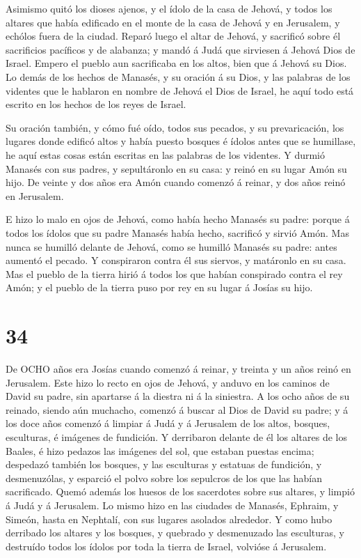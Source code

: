  Asimismo quitó los dioses ajenos, y el ídolo de la casa de
Jehová, y todos los altares que había edificado en el monte de la casa
de Jehová y en Jerusalem, y echólos fuera de la ciudad. 
Reparó luego el altar de Jehová, y sacrificó sobre él sacrificios
pacíficos y de alabanza; y mandó á Judá que sirviesen á Jehová Dios de
Israel.  Empero el pueblo aun sacrificaba en los altos,
bien que á Jehová su Dios.  Lo demás de los hechos de
Manasés, y su oración á su Dios, y las palabras de los videntes que le
hablaron en nombre de Jehová el Dios de Israel, he aquí todo está
escrito en los hechos de los reyes de Israel.

 Su oración también, y cómo fué oído, todos sus pecados, y
su prevaricación, los lugares donde edificó altos y había puesto bosques
é ídolos antes que se humillase, he aquí estas cosas están escritas en
las palabras de los videntes.  Y durmió Manasés con sus
padres, y sepultáronlo en su casa: y reinó en su lugar Amón su hijo.
 De veinte y dos años era Amón cuando comenzó á reinar, y
dos años reinó en Jerusalem.

 E hizo lo malo en ojos de Jehová, como había hecho Manasés
su padre: porque á todos los ídolos que su padre Manasés había hecho,
sacrificó y sirvió Amón.  Mas nunca se humilló delante de
Jehová, como se humilló Manasés su padre: antes aumentó el pecado.
 Y conspiraron contra él sus siervos, y matáronlo en su
casa.  Mas el pueblo de la tierra hirió á todos los que
habían conspirado contra el rey Amón; y el pueblo de la tierra puso por
rey en su lugar á Josías su hijo. 

\hypertarget{section-33}{%
\section{34}\label{section-33}}

 De OCHO años era Josías cuando comenzó á reinar, y treinta
y un años reinó en Jerusalem.  Este hizo lo recto en ojos de
Jehová, y anduvo en los caminos de David su padre, sin apartarse á la
diestra ni á la siniestra.  A los ocho años de su reinado,
siendo aún muchacho, comenzó á buscar al Dios de David su padre; y á los
doce años comenzó á limpiar á Judá y á Jerusalem de los altos, bosques,
esculturas, é imágenes de fundición.  Y derribaron delante
de él los altares de los Baales, é hizo pedazos las imágenes del sol,
que estaban puestas encima; despedazó también los bosques, y las
esculturas y estatuas de fundición, y desmenuzólas, y esparció el polvo
sobre los sepulcros de los que las habían sacrificado. 
Quemó además los huesos de los sacerdotes sobre sus altares, y limpió á
Judá y á Jerusalem.  Lo mismo hizo en las ciudades de
Manasés, Ephraim, y Simeón, hasta en Nephtalí, con sus lugares asolados
alrededor.  Y como hubo derribado los altares y los bosques,
y quebrado y desmenuzado las esculturas, y destruído todos los ídolos
por toda la tierra de Israel, volvióse á Jerusalem.

